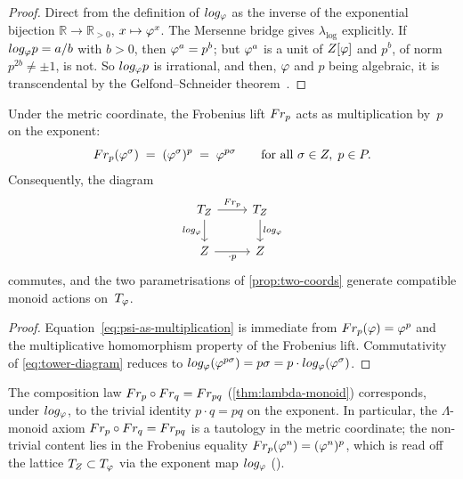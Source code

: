 
\begin{proof}
Direct from the definition of $log_\varphi$ as the inverse of the
exponential bijection $\mathbb{R}\to\mathbb{R}_{>0}$,
$x\mapsto\varphi^x$.  The Mersenne bridge gives $\lambda_{\log}$
explicitly.  If $log_\varphi p=a/b$ with $b>0$, then $\varphi^a=p^b$; but
$\varphi^a$ is a unit of $Z[\varphi]$ and $p^b$, of norm $p^{2b}\ne\pm1$, is not.  So
$log_\varphi p$ is irrational, and then, $\varphi$ and $p$ being algebraic, it is
transcendental by the Gelfond--Schneider theorem~\cite{gelfond34,schneider35}.
\end{proof}

\begin{proposition}\label{thm:tower-compat}
Under the metric coordinate, the Frobenius lift $Fr_p$ acts as
multiplication by~$p$ on the exponent:
\begin{equation}\label{eq:psi-as-multiplication}
  Fr_p(\varphi^\sigma) \;=\; (\varphi^\sigma)^p \;=\; \varphi^{p\sigma}
  \qquad\text{for all } \sigma\in Z,\; p\in P.
\end{equation}
Consequently, the diagram
\begin{equation}\label{eq:tower-diagram}
\begin{tikzcd}
T_\mathbb{Z} \arrow[r, "{\Frob_p}"] \arrow[d, "\log_\golden"'] &
T_\mathbb{Z} \arrow[d, "\log_\golden"] \\
\mathbb{Z} \arrow[r, "\cdot p"'] & \mathbb{Z}
\end{tikzcd}
\end{equation}
commutes, and the two parametrisations of \cref{prop:two-coords}
generate compatible monoid actions on~$T_\varphi$.
\end{proposition}

\begin{proof}
Equation~\eqref{eq:psi-as-multiplication} is immediate from
$Fr_p(\varphi) = \varphi^p$ and the multiplicative homomorphism
property of the Frobenius lift.  Commutativity of
\eqref{eq:tower-diagram} reduces to
$log_\varphi(\varphi^{p\sigma}) = p\sigma = p\cdot log_\varphi(\varphi^\sigma)$.
\end{proof}

\begin{remark}\label{cor:frob-as-mul}
The composition law $Fr_p\circ Fr_q = Fr_{pq}$
\textup{(\cref{thm:lambda-monoid})} corresponds, under
$log_\varphi$, to the trivial identity $p\cdot q = pq$ on the
exponent.  In particular, the $\Lambda$-monoid axiom
$Fr_p\circ Fr_q = Fr_{pq}$ is a tautology in the metric
coordinate; the non-trivial content lies in the
Frobenius equality $Fr_p(\varphi^n) = (\varphi^n)^p$, which is
read off the lattice $T_Z\subset T_\varphi$ via the
exponent map $log_\varphi$ ().
\end{remark}

